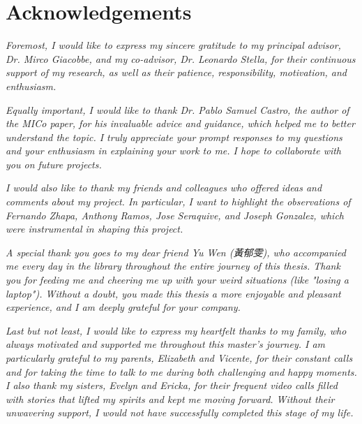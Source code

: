 
\chapter*{Acknowledgements}
\textit{Foremost, I would like to express my sincere gratitude to my principal advisor, Dr. Mirco Giacobbe, and my co-advisor, Dr. Leonardo Stella, for their continuous support of my research, as well as their patience, responsibility, motivation, and enthusiasm.}

\textit{Equally important, I would like to thank Dr. Pablo Samuel Castro, the author of the MICo paper, for his invaluable advice and guidance, which helped me to better understand the topic. I truly appreciate your prompt responses to my questions and your enthusiasm in explaining your work to me. I hope to collaborate with you on future projects.}

\textit{I would also like to thank my friends and colleagues who offered ideas and comments about my project. In particular, I want to highlight the observations of Fernando Zhapa, Anthony Ramos, Jose Seraquive, and Joseph Gonzalez, which were instrumental in shaping this project.}

\begin{CJK}{UTF8}{bsmi}
\textit{A special thank you goes to my dear friend Yu Wen (黃郁雯), who accompanied me every day in the library throughout the entire journey of this thesis. Thank you for feeding me and cheering me up with your weird situations (like "losing a laptop"). Without a doubt, you made this thesis a more enjoyable and pleasant experience, and I am deeply grateful for your company.}
\end{CJK}

\textit{Last but not least, I would like to express my heartfelt thanks to my family, who always motivated and supported me throughout this master's journey. I am particularly grateful to my parents, Elizabeth and Vicente, for their constant calls and for taking the time to talk to me during both challenging and happy moments. I also thank my sisters, Evelyn and Ericka, for their frequent video calls filled with stories that lifted my spirits and kept me moving forward. Without their unwavering support, I would not have successfully completed this stage of my life.}